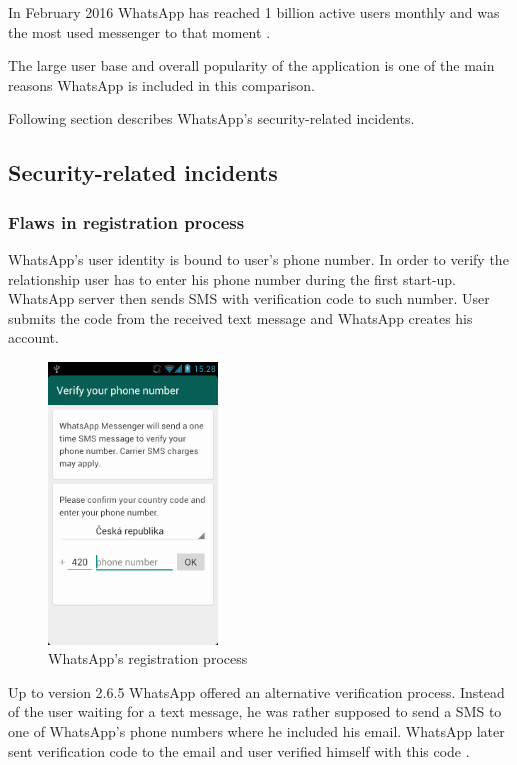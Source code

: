 \documentclass[thesis=M,english]{FITthesis}[2012/10/20]
\begin{document}
In February 2016 WhatsApp has reached 1 billion active users monthly and was the most used messenger to that moment \cite{whatsappusers}.

The large user base and overall popularity of the application is one of the main reasons WhatsApp is included in this comparison.

Following section describes WhatsApp's security-related incidents.

\subsection{Security-related incidents}

\subsubsection{Flaws in registration process}\label{whatsapp-registration}

WhatsApp's user identity is bound to user's phone number. In order to verify the relationship user has to enter his phone number during the first start-up. WhatsApp server then sends SMS with verification code to such number. User submits the code from the received text message and WhatsApp creates his account.  

\begin{figure}[htb]
	\centering
	\includegraphics[width=0.4\textwidth]{whatsapp-registration.png}
	\caption{WhatsApp's registration process}
	\label{img:whatsapp_reg}
\end{figure}

Up to version 2.6.5 WhatsApp offered an alternative verification process. Instead of the user waiting for a text message, he was rather supposed to send a SMS to one of WhatsApp's phone numbers where he included his email. WhatsApp later sent verification code to the email and user verified himself with this code \cite{whatsapp-shootingthemsg}.
\end{document}
